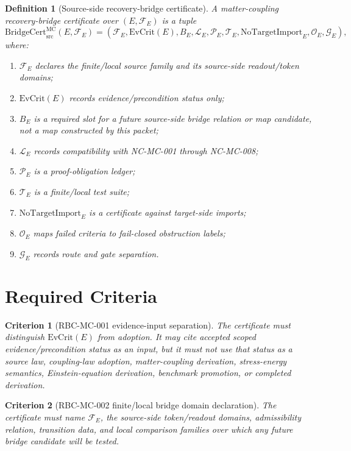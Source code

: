 \documentclass[11pt]{article}
\newtheorem{definition}{Definition}
\newtheorem{criterion}{Criterion}
\newcommand{\BridgeCert}{\mathrm{BridgeCert}_{\mathrm{src}}^{\mathrm{MC}}}
\newcommand{\EvCrit}{\mathrm{EvCrit}}
\newcommand{\NoTargetImport}{\mathrm{NoTargetImport}}
\begin{document}
\begin{definition}[Source-side recovery-bridge certificate]
A matter-coupling recovery-bridge certificate over \((E,\mathcal{F}_E)\) is a
tuple
\[
  \BridgeCert(E,\mathcal{F}_E)
  =
  (\mathcal{F}_E,\EvCrit(E),B_E,\mathcal{L}_E,\mathcal{P}_E,\mathcal{T}_E,
  \NoTargetImport_E,\mathcal{O}_E,\mathcal{G}_E),
\]
where:
\begin{enumerate}[label=(\roman*),leftmargin=*]
  \item \(\mathcal{F}_E\) declares the finite/local source family and its
  source-side readout/token domains;
  \item \(\EvCrit(E)\) records evidence/precondition status only;
  \item \(B_E\) is a required slot for a future source-side bridge relation or
  map candidate, not a map constructed by this packet;
  \item \(\mathcal{L}_E\) records compatibility with NC-MC-001 through
  NC-MC-008;
  \item \(\mathcal{P}_E\) is a proof-obligation ledger;
  \item \(\mathcal{T}_E\) is a finite/local test suite;
  \item \(\NoTargetImport_E\) is a certificate against target-side imports;
  \item \(\mathcal{O}_E\) maps failed criteria to fail-closed obstruction
  labels;
  \item \(\mathcal{G}_E\) records route and gate separation.
\end{enumerate}
\end{definition}

\section{Required Criteria}

\begin{criterion}[RBC-MC-001 evidence-input separation]
The certificate must distinguish \(\EvCrit(E)\) from adoption. It may cite
accepted scoped evidence/precondition status as an input, but it must not use
that status as a source law, coupling-law adoption, matter-coupling derivation,
stress-energy semantics, Einstein-equation derivation, benchmark promotion, or
completed derivation.
\end{criterion}

\begin{criterion}[RBC-MC-002 finite/local bridge domain declaration]
The certificate must name \(\mathcal{F}_E\), the source-side token/readout
domains, admissibility relation, transition data, and local comparison
families over which any future bridge candidate will be tested.
\end{criterion}
\end{document}
